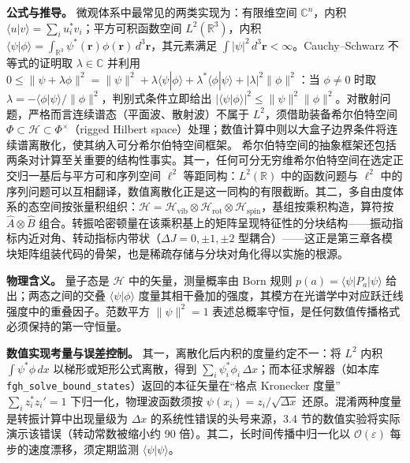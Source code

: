 \documentclass[
]{ctexbook}
\begin{document}
\textbf{公式与推导。} 微观体系中最常见的两类实现为：有限维空间
\(\mathbb{C}^{n}\)，内积
\(\langle u|v\rangle=\sum_i u_i^{*}v_i\)；平方可积函数空间
\(L^{2}(\mathbb{R}^{3})\)，内积
\(\langle\psi|\phi\rangle=\int_{\mathbb{R}^{3}}\psi^{*}(\mathbf{r})\phi(\mathbf{r})\,d^{3}\mathbf{r}\)，其元素满足
\(\int|\psi|^{2}\,d^{3}\mathbf{r}<\infty\)。Cauchy--Schwarz
不等式的证明取 \(\lambda\in\mathbb{C}\) 并利用
\(0\le\|\psi+\lambda\phi\|^{2}=\|\psi\|^{2}+\lambda\langle\psi|\phi\rangle+\lambda^{*}\langle\phi|\psi\rangle+|\lambda|^{2}\|\phi\|^{2}\)：当
\(\phi\neq 0\) 时取
\(\lambda=-\langle\phi|\psi\rangle/\|\phi\|^{2}\)，判别式条件立即给出
\(|\langle\psi|\phi\rangle|^{2}\le\|\psi\|^{2}\|\phi\|^{2}\)。对散射问题，严格而言连续谱态（平面波、散射波）不属于
\(L^{2}\)，须借助装备希尔伯特空间
\(\Phi\subset\mathcal{H}\subset\Phi^{\times}\)（rigged Hilbert
space）处理；数值计算中则以大盒子边界条件将连续谱离散化，使其纳入可分希尔伯特空间框架。
希尔伯特空间的抽象框架还包括两条对计算至关重要的结构性事实。其一，任何可分无穷维希尔伯特空间在选定正交归一基后与平方可和序列空间
\(\ell^{2}\) 等距同构：\(L^{2}(\mathbb{R})\) 中的函数问题与 \(\ell^{2}\)
中的序列问题可以互相翻译，数值离散化正是这一同构的有限截断。其二，多自由度体系的态空间按张量积组织：\(\mathcal{H}=\mathcal{H}_{\mathrm{vib}}\otimes\mathcal{H}_{\mathrm{rot}}\otimes\mathcal{H}_{\mathrm{spin}}\)，基组按乘积构造，算符按
\(\hat{A}\otimes\hat{B}\)
组合。转振哈密顿量在该乘积基上的矩阵呈现特征性的分块结构------振动指标内近对角、转动指标内带状（\(\Delta J=0,\pm1,\pm2\)
型耦合）------这正是第三章各模块矩阵组装代码的骨架，也是稀疏存储与分块对角化得以实施的根源。

\textbf{物理含义。} 量子态是 \(\mathcal{H}\) 中的矢量，测量概率由 Born
规则 \(p(a)=\langle\psi|P_{a}|\psi\rangle\) 给出；两态之间的交叠
\(\langle\psi|\phi\rangle\)
度量其相干叠加的强度，其模方在光谱学中对应跃迁线强度中的重叠因子。范数平方
\(\|\psi\|^{2}=1\)
表述总概率守恒，是任何数值传播格式必须保持的第一守恒量。

\textbf{数值实现考量与误差控制。} 其一，离散化后内积的度量约定不一：将
\(L^{2}\) 内积 \(\int\psi^{*}\phi\,dx\) 以梯形或矩形公式离散，得到
\(\sum_i\psi_i^{*}\phi_i\,\Delta x\)；而本征求解器（如本库
\texttt{fgh\_solve\_bound\_states}）返回的本征矢量在``格点 Kronecker
度量'' \(\sum_i z_i^{*}z_i'=1\) 下归一化，物理波函数须按
\(\psi(x_i)=z_i/\sqrt{\Delta x}\)
还原。混淆两种度量是转振计算中出现量级为 \(\Delta x\)
的系统性错误的头号来源，3.4
节的数值实验将实际演示该错误（转动常数被缩小约 90
倍）。其二，长时间传播中归一化以 \(\mathcal{O}(\varepsilon)\)
每步的速度漂移，须定期监测 \(\langle\psi|\psi\rangle\)。
\end{document}
